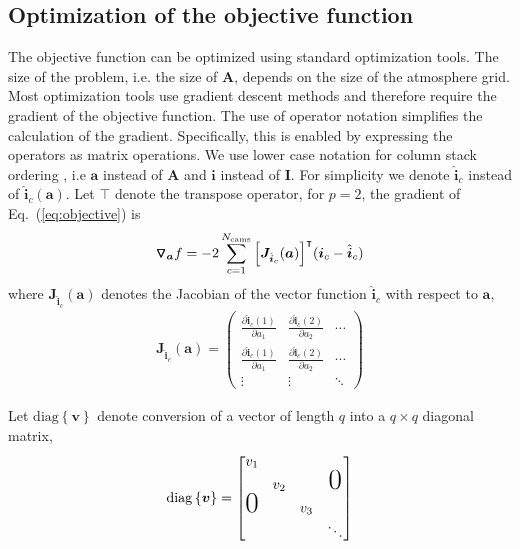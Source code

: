 \documentclass[10pt,twocolumn,letterpaper]{article}
\newcommand{\OpDiag}[1]{\mathrm{diag}\left\{#1\right\}}
\newcommand{\Grad}[1]{\bm{\triangledown_{#1}}}
\newcommand{\PartDeriv}[2]{\frac{\partial{#1}}{\partial{#2}}}
\newcommand{\vect}[1]{\bm{#1}}
\newcommand{\mat}[1]{\bm{#1}}
\newcommand{\transpose}[1]{{#1}^\intercal}
\begin{document}
\subsection{Optimization of the objective function}
\label{sec:optim-object-funct}

The objective function can be optimized using standard optimization
tools. The size of the problem, i.e. the size of $\mat{A}$, depends on
the size of the atmosphere grid.  Most optimization tools use
gradient descent methods and therefore require the gradient of the
objective function.  The use of operator
notation simplifies the calculation of the gradient. Specifically,
this is enabled by expressing the operators as matrix operations. We
use lower case notation for column stack ordering , i.e $\vect{a}$
instead of $\mat{A}$ and $\vect{i}$ instead of $\mat{I}$. For
simplicity we denote $\hat{\vect{i}}_c$ instead of
$\hat{\vect{i}}_c(\vect{a})$. Let $\intercal$ denote the transpose
operator, for $p=2$, the gradient of
Eq.~(\ref{eq:objective}) is
\begin{align}
  \Grad{\vect{a}} f = -2\sum_{c=1}^{N_{\rm cams}}
  \transpose{\left[\mat{J}_{\hat{\vect{i}}_c}(\vect{a})\right]}(\vect{i}_c-\hat{\vect{i}}_c)
  \label{eq:gradient1}
\end{align}
where $\mat{J}_{\hat{\vect{i}}_c}(\vect{a})$ denotes the Jacobian of
the vector function $\hat{\vect{i}}_c$ with respect to $\vect{a}$,
\begin{align}
  \mat{J}_{\hat{\vect{i}}_c}(\vect{a}) =
  \begin{pmatrix}
    \PartDeriv{\hat{\vect{i}}_{c}(1)}{a_1} & \PartDeriv{\hat{\vect{i}}_{c}(2)}{a_2} & \cdots \\
    \PartDeriv{\hat{\vect{i}}_{c}(1)}{a_1} & \PartDeriv{\hat{\vect{i}}_{c}(2)}{a_2} & \cdots \\
    \vdots & \vdots & \ddots
  \end{pmatrix}
\end{align}

Let $\OpDiag{\vect{\vect{v}}}$ denote conversion of a vector of length
$q$ into a $q \times q$ diagonal matrix,
\begin{equation*}
  \OpDiag{\vect{v}} =
  \begin{bmatrix}
    v_1 & & & \\
    & v_2 & & \text{\huge{0}} \\
    \text{\huge{0}} & & v_3 & \\
    & & & \ddots
  \end{bmatrix}
\end{equation*}
\end{document}
